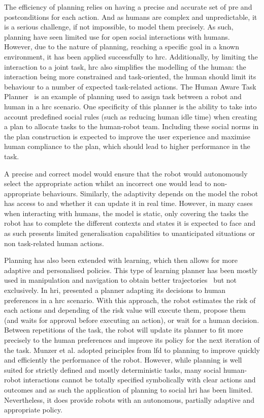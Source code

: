 The efficiency of planning relies on having a precise and accurate set of pre and postconditions for each action. And as humans are complex and unpredictable, it is a serious challenge, if not impossible, to model them precisely. As such, planning have seen limited use for open social interactions with humans. However, due to the nature of planning, reaching a specific goal in a known environment, it has been applied successfully to \acrfull{hrc}. Additionally, by limiting the interaction to a joint task, \gls{hrc} also simplifies the modelling of the human: the interaction being more constrained and task-oriented, the human should limit its behaviour to a number of expected task-related actions. The Human Aware Task Planner~\citep{alili2009task} is an example of planning used to assign task between a robot and human in a \gls{hrc} scenario. One specificity of this planner is the ability to take into account predefined social rules (such as reducing human idle time) when creating a plan to allocate tasks to the human-robot team. Including these social norms in the plan construction is expected to improve the user experience and  maximise human compliance to the plan, which should lead to higher performance in the task.

A precise and correct model would ensure that the robot would autonomously select the appropriate action whilst an incorrect one would lead to non-appropriate behaviours. Similarly, the adaptivity depends on the model the robot has access to and whether it can update it in real time. However, in many cases when interacting with humans, the model is static, only covering the tasks the robot has to complete the different contexts and states it is expected to face and as such presents limited generalisation capabilities to unanticipated situations or non task-related human actions.

Planning has also been extended with learning, which then allows for more adaptive and personalised policies. This type of learning planner has been mostly used in manipulation and navigation to obtain better trajectories~\citep{jain2013learning,beetz2004rpllearn} but not exclusively. In \gls{hri}, \cite{munzer2017efficient} presented a planner adapting its decisions to human preferences in a \gls{hrc} scenario. With this approach, the robot estimates the risk of each actions and depending of the risk value will execute them, propose them (and waits for approval before executing an action), or wait for a human decision. Between repetitions of the task, the robot will update its planner to fit more precisely to the human preferences and improve its policy for the next iteration of the task. Munzer et al. adopted principles from \gls{lfd} to planning to improve quickly and efficiently the performance of the robot. However, while planning is well suited for strictly defined and mostly deterministic tasks, many social human-robot interactions cannot be totally specified symbolically with clear actions and outcomes and as such the application of planning to social \gls{hri} has been limited. Nevertheless, it does provide robots with an autonomous, partially adaptive and appropriate policy.
	
